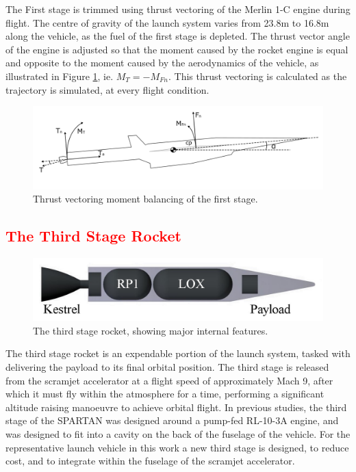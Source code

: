   The First stage is trimmed using thrust vectoring of the Merlin 1-C engine during flight. The centre of gravity of the launch system varies from 23.8m to 16.8m along the vehicle, as the fuel of the first stage is depleted. The thrust vector angle of the engine is adjusted so that the moment caused by the rocket engine is equal and opposite to the moment caused by the aerodynamics of the vehicle, as illustrated in Figure \ref{fig:FirstStageThrustVec}, ie. $M_T = -M_{Fn}$.
  This thrust vectoring is calculated as the trajectory is simulated, at every flight condition. 
 

\begin{figure}
\centering
\includegraphics[width=0.9\linewidth]{figures/3_vehicle_design/FirstStageThrustVec}
\caption{Thrust vectoring moment balancing of the first stage.}
\label{fig:FirstStageThrustVec}
\end{figure}
  
  
  



	

	\textcolor{red}{\section{The Third Stage Rocket}\label{sec:ThirdStageBaseline}}

	\begin{figure}
\centering
\includegraphics[width=0.7\linewidth]{figures/3_vehicle_design/3rdStage}
\caption{The third stage rocket, showing major internal features. }
\label{fig:3rdStage}
\end{figure}

The third stage rocket is an expendable portion of the launch system, tasked with delivering the payload to its final orbital position. 
  The third stage is released from the scramjet accelerator at a flight speed of approximately Mach 9, after which it must fly within the atmosphere for a time, performing a significant altitude raising manoeuvre to achieve orbital flight\cite{Preller2017b}. 
  In previous studies, the third stage of the SPARTAN was designed around a pump-fed RL-10-3A engine\cite{Preller2017b}, and was designed to fit into a cavity on the back of the fuselage of the vehicle\cite{Preller2017b}. For the representative launch vehicle in this work a new third stage is designed, to reduce cost, and to integrate within the fuselage of the scramjet accelerator. 
   
